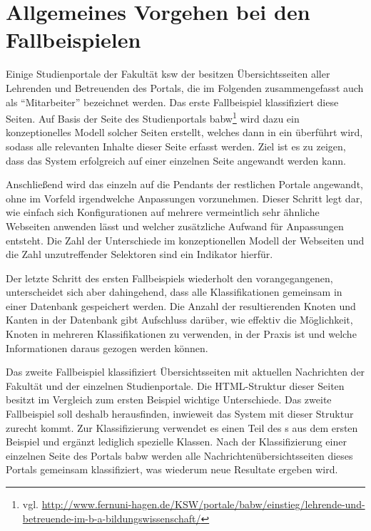 \section{Allgemeines Vorgehen bei den Fallbeispielen}
    \label{section:findingsMethod}
    Einige Studienportale der Fakultät \gls{ksw} der {\fernUni}
    besitzen Übersichtsseiten aller Lehrenden und Betreuenden des Portals,
    die im Folgenden zusammengefasst auch als "`Mitarbeiter"' bezeichnet werden.
    Das erste Fallbeispiel klassifiziert diese Seiten.
    Auf Basis der Seite des Studienportals
    \gls{babw}\footnote{vgl. \url{http://www.fernuni-hagen.de/KSW/portale/babw/einstieg/lehrende-und-betreuende-im-b-a-bildungswissenschaft/}}
    wird dazu ein konzeptionelles Modell solcher Seiten erstellt,
    welches dann in ein {\classificationModel} überführt wird,
    sodass alle relevanten Inhalte dieser Seite erfasst werden.
    Ziel ist es zu zeigen, dass das System erfolgreich auf einer einzelnen Seite angewandt werden kann.

    Anschließend wird das {\classificationModel} einzeln auf die Pendants der restlichen Portale angewandt,
    ohne im Vorfeld irgendwelche Anpassungen vorzunehmen.
    Dieser Schritt legt dar, wie einfach sich Konfigurationen auf mehrere vermeintlich
    sehr ähnliche Webseiten anwenden lässt und welcher zusätzliche Aufwand für Anpassungen entsteht.
    Die Zahl der Unterschiede im konzeptionellen Modell der Webseiten und die Zahl unzutreffender Selektoren sind ein Indikator hierfür.

    Der letzte Schritt des ersten Fallbeispiels wiederholt den vorangegangenen,
    unterscheidet sich aber dahingehend, dass alle Klassifikationen
    gemeinsam in einer Datenbank gespeichert werden.
    Die Anzahl der resultierenden Knoten und Kanten in der Datenbank
    gibt Aufschluss darüber, wie effektiv die Möglichkeit, Knoten in mehreren Klassifikationen
    zu verwenden, in der Praxis ist und welche Informationen daraus gezogen werden können.

    Das zweite Fallbeispiel klassifiziert Übersichtsseiten mit aktuellen Nachrichten
    der Fakultät und der einzelnen Studienportale.
    Die HTML-Struktur dieser Seiten besitzt im Vergleich zum ersten Beispiel wichtige Unterschiede.
    Das zweite Fallbeispiel soll deshalb herausfinden, inwieweit das System mit dieser Struktur zurecht kommt.
    Zur Klassifizierung verwendet es einen Teil des {\classificationModel}s aus dem ersten Beispiel
    und ergänzt lediglich spezielle Klassen.
    Nach der Klassifizierung einer einzelnen Seite des Portals \gls{babw}
    werden alle Nachrichtenübersichtsseiten dieses Portals gemeinsam klassifiziert,
    was wiederum neue Resultate ergeben wird.


